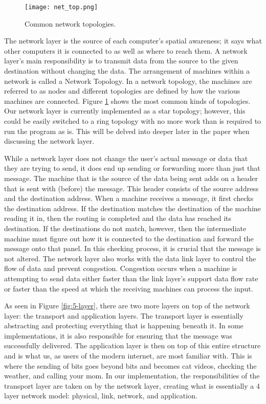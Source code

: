 \documentclass[10pt, letterpaper, twocolumn]{article}
\begin{document}
\begin{figure}[ht]
\centering
\texttt{[image: net\_top.png]}
\caption{Common network topologies.}
\label{fig:topologies}
\end{figure}
The network layer is the source of each computer’s spatial awareness; it says what other computers it is connected to as well as where to reach them. A network layer’s main responsibility is to transmit data from the source to the given destination without changing the data. The arrangement of machines within a network is called a Network Topology. In a network topology, the machines are referred to as nodes and different topologies are defined by how the various machines are connected. Figure \ref{fig:topologies} shows the most common kinds of topologies. Our network layer is currently implemented as a star topology; however, this could be easily switched to a ring topology with no more work than is required to run the program as is. This will be delved into deeper later in the paper when discussing the network layer. 

While a network layer does not change the user’s actual message or data that they are trying to send, it does end up sending or forwarding more than just that message. The machine that is the source of the data being sent adds on a header that is sent with (before) the message. This header consists of the source address and the destination address. When a machine receives a message, it first checks the destination address. If the destination matches the destination of the machine reading it in, then the routing is completed and the data has reached its destination. If the destinations do not match, however, then the intermediate machine must figure out how it is connected to the destination and forward the message onto that panel. In this checking process, it is crucial that the message is not altered. The network layer also works with the data link layer to control the flow of data and prevent congestion. Congestion occurs when a machine is attempting to send data either faster than the link layer’s support data flow rate or faster than the speed at which the receiving machines can process the input.

As seen in Figure \ref{fig:5-layer}, there are two more layers on top of the network layer: the transport and application layers. The transport layer is essentially abstracting and protecting everything that is happening beneath it. In some implementations, it is also responsible for ensuring that the message was successfully delivered. The application layer is then on top of this entire structure and is what us, as users of the modern internet, are most familiar with. This is where the sending of bits goes beyond bits and becomes cat videos, checking the weather, and calling your mom. In our implementation, the responsibilities of the transport layer are taken on by the network layer, creating what is essentially a 4 layer network model: physical, link, network, and application. 
\end{document}
